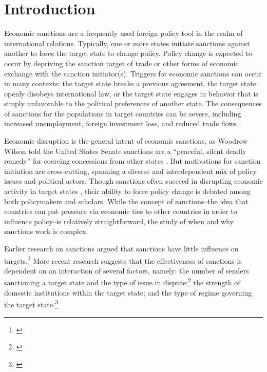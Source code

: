 \section*{Introduction}
\label{intro}

Economic sanctions are a frequently used foreign policy tool in the realm of international relations. Typically, one or more states initiate sanctions against another to force the target state to change policy. Policy change is expected to occur by depriving the sanction target of trade or other forms of economic exchange with the sanction initiator(s). Triggers for economic sanctions can occur in many contexts: the target state breaks a previous agreement, the target state openly disobeys international law, or the target state engages in behavior that is simply unfavorable to the political preferences of another state. The consequences of sanctions for the populations in target countries can be severe, including increased unemployment, foreign investment loss, and reduced trade flows \citep{hufbauer2003impact,hufbauer1997us}. 

Economic disruption is the general intent of economic sanctions, as Woodrow Wilson told the United States Senate sanctions are a ``peaceful, silent deadly remedy'' for coercing concessions from other states \citep{foley23}. But motivations for sanction initiation are cross-cutting, spanning a diverse and interdependent mix of policy issues and political actors. Though sanctions often succeed in disrupting economic activity in target states \citep{escriba2010dealing}, their ability to force policy change is debated among both policymakers and scholars.  While the concept of sanctions--the idea that countries can put pressure via economic ties to other countries in order to influence policy--is relatively straightforward, the study of when and why sanctions work is complex.

Earlier research on sanctions argued that sanctions have little influence on targets.\footnote{\cite{lam1990, dashti1997, morgan1997, drezner1998}} More recent research suggests that the effectiveness of sanctions is dependent on an interaction of several factors, namely: the number of senders sanctioning a target state and the type of issue in dispute;\footnote{\cite{miers2002, morgan2009threat}} the strength of domestic institutions within the target state; and the type of regime governing the target state.\footnote{\cite{mcgillivray2004}} 

